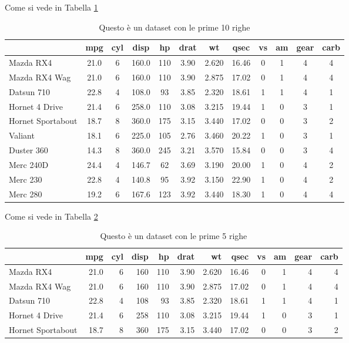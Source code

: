 \documentclass[
]{article}
\begin{document}
Come si vede in Tabella \ref{tab:cars-table1}

\begin{table}[H]

\caption{\label{tab:cars-table1}Questo è un dataset con le prime 10 righe}
\centering
\begin{tabular}[t]{l|c|c|c|c|c|c|c|c|c|c|c}
\hline
  & mpg & cyl & disp & hp & drat & wt & qsec & vs & am & gear & carb\\
\hline
Mazda RX4 & 21.0 & 6 & 160.0 & 110 & 3.90 & 2.620 & 16.46 & 0 & 1 & 4 & 4\\
\hline
Mazda RX4 Wag & 21.0 & 6 & 160.0 & 110 & 3.90 & 2.875 & 17.02 & 0 & 1 & 4 & 4\\
\hline
Datsun 710 & 22.8 & 4 & 108.0 & 93 & 3.85 & 2.320 & 18.61 & 1 & 1 & 4 & 1\\
\hline
Hornet 4 Drive & 21.4 & 6 & 258.0 & 110 & 3.08 & 3.215 & 19.44 & 1 & 0 & 3 & 1\\
\hline
Hornet Sportabout & 18.7 & 8 & 360.0 & 175 & 3.15 & 3.440 & 17.02 & 0 & 0 & 3 & 2\\
\hline
Valiant & 18.1 & 6 & 225.0 & 105 & 2.76 & 3.460 & 20.22 & 1 & 0 & 3 & 1\\
\hline
Duster 360 & 14.3 & 8 & 360.0 & 245 & 3.21 & 3.570 & 15.84 & 0 & 0 & 3 & 4\\
\hline
Merc 240D & 24.4 & 4 & 146.7 & 62 & 3.69 & 3.190 & 20.00 & 1 & 0 & 4 & 2\\
\hline
Merc 230 & 22.8 & 4 & 140.8 & 95 & 3.92 & 3.150 & 22.90 & 1 & 0 & 4 & 2\\
\hline
Merc 280 & 19.2 & 6 & 167.6 & 123 & 3.92 & 3.440 & 18.30 & 1 & 0 & 4 & 4\\
\hline
\end{tabular}
\end{table}

Come si vede in Tabella \ref{tab:cars-table}

\begin{table}[H]

\caption{\label{tab:cars-table}Questo è un dataset con le prime 5 righe}
\centering
\begin{tabular}[t]{l|r|r|r|r|r|r|r|r|r|r|r}
\hline
  & mpg & cyl & disp & hp & drat & wt & qsec & vs & am & gear & carb\\
\hline
Mazda RX4 & 21.0 & 6 & 160 & 110 & 3.90 & 2.620 & 16.46 & 0 & 1 & 4 & 4\\
\hline
Mazda RX4 Wag & 21.0 & 6 & 160 & 110 & 3.90 & 2.875 & 17.02 & 0 & 1 & 4 & 4\\
\hline
Datsun 710 & 22.8 & 4 & 108 & 93 & 3.85 & 2.320 & 18.61 & 1 & 1 & 4 & 1\\
\hline
Hornet 4 Drive & 21.4 & 6 & 258 & 110 & 3.08 & 3.215 & 19.44 & 1 & 0 & 3 & 1\\
\hline
Hornet Sportabout & 18.7 & 8 & 360 & 175 & 3.15 & 3.440 & 17.02 & 0 & 0 & 3 & 2\\
\hline
\end{tabular}
\end{table}
\end{document}
